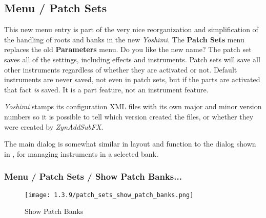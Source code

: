 %
%
%

\subsection{Menu / Patch Sets}
\label{subsubsec:menu_patch_sets}

   This new menu entry is part of the very nice reorganization and simplification
   of the handling of roots and banks in the new \textsl{Yoshimi}.  The
   \textbf{Patch Sets} menu replaces the old \textbf{Parameters} menu.  Do you
   like the new name?  The patch set saves all of the settings, including effects
   and instruments.  Patch sets will save all other instruments regardless of
   whether they are activated or not.  Default instruments are never saved, not
   even in patch sets, but if the parts are activated that fact \textsl{is}
   saved.  It is a part feature, not an instrument feature.

   \textsl{Yoshimi} stamps its configuration XML files with its own major and
   minor version numbers so it is possible to tell which version created the
   files, or whether they were created by \textsl{ZynAddSubFX}.

   The main dialog is somewhat similar in layout and function to the
   dialog shown in
   ,
   for managing instruments in a selected bank.

\subsubsection{Menu / Patch Sets / Show Patch Banks...}
\label{subsubsec:menu_patch_sets_show_patch_banks}

\begin{figure}[H]
   \centering 
   \texttt{[image: 1.3.9/patch\_sets\_show\_patch\_banks.png]}
   \caption[Show Patch Banks]{Show Patch Banks}
   \label{fig:show_patch_banks}
\end{figure}

